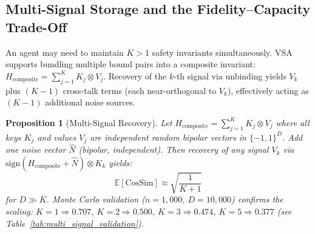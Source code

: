\documentclass[a4paper,11pt]{article}
\newtheorem{proposition}{Proposition}
\begin{document}
\subsection{Multi-Signal Storage and the Fidelity--Capacity Trade-Off}
\label{sec:multi_signal}

An agent may need to maintain $K > 1$ safety invariants simultaneously. VSA supports bundling multiple bound pairs into a composite invariant: $H_{\text{composite}} = \sum_{j=1}^{K} K_j \otimes V_j$. Recovery of the $k$-th signal via unbinding yields $V_k$ plus $(K-1)$ cross-talk terms (each near-orthogonal to $V_k$), effectively acting as $(K-1)$ additional noise sources.

\begin{proposition}[Multi-Signal Recovery]
\label{prop:multi_signal}
Let $H_{\text{composite}} = \sum_{j=1}^{K} K_j \otimes V_j$ where all keys $K_j$ and values $V_j$ are independent random bipolar vectors in $\{-1,1\}^D$. Add one noise vector $\hat{N}$ (bipolar, independent). Then recovery of any signal $V_k$ via $\text{sign}(H_{\text{composite}} + \hat{N}) \otimes K_k$ yields:
\begin{equation}
    \mathbb{E}\!\left[\text{CosSim}\right] \approx \sqrt{\frac{1}{K+1}}
    \label{eq:multi_signal}
\end{equation}
for $D \gg K$. Monte Carlo validation ($n = 1{,}000$, $D = 10{,}000$) confirms the scaling: $K=1 \Rightarrow 0.707$, $K=2 \Rightarrow 0.500$, $K=3 \Rightarrow 0.474$, $K=5 \Rightarrow 0.377$ (see Table~\ref{tab:multi_signal_validation}).
\end{proposition}
\end{document}
